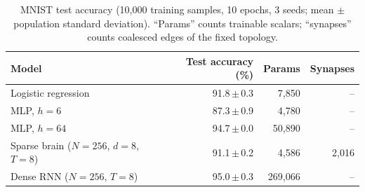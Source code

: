 \begin{table}[t]
\centering
\small
\caption{MNIST test accuracy (10{,}000 training samples, 10 epochs, 3 seeds; mean $\pm$ population standard deviation). ``Params'' counts trainable scalars; ``synapses'' counts coalesced edges of the fixed topology.}
\label{tab:models}
\begin{tabular}{lrrr}
\toprule
Model & Test accuracy (\%) & Params & Synapses \\
\midrule
Logistic regression & 91.8\,$\pm$\,0.3 & 7,850 & -- \\
MLP, $h=6$ & 87.3\,$\pm$\,0.9 & 4,780 & -- \\
MLP, $h=64$ & 94.7\,$\pm$\,0.0 & 50,890 & -- \\
Sparse brain ($N{=}256$, $d{=}8$, $T{=}8$) & 91.1\,$\pm$\,0.2 & 4,586 & 2,016 \\
Dense RNN ($N{=}256$, $T{=}8$) & 95.0\,$\pm$\,0.3 & 269,066 & -- \\
\bottomrule
\end{tabular}
\end{table}
